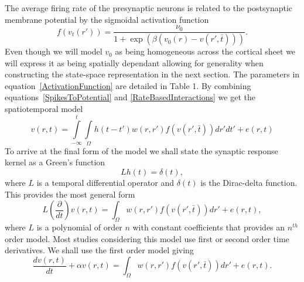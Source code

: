\documentclass[onecolumn,draftcls]{IEEEtran}
\begin{document}
The average firing rate of the presynaptic neurons is related to the postsynaptic membrane potential by the sigmoidal activation function
\begin{equation}\label{ActivationFunction}
f\left( {{v_t}\left( {r'} \right)} \right) = \frac{{{\nu _0}}}{{1 + \exp \left( {\beta \left( {{v_0}\left( r \right) - {v}\left(r',\bar{t} \right)} \right)} \right)}}.
\end{equation}
Even though we will model  $v_0$ as being homogeneous across the cortical sheet we will express it as being spatially dependant allowing for generality when constructing the state-space representation in the next section. The parameters in equation~\ref{ActivationFunction} are detailed in Table 1. By combining equations~\ref{SpikesToPotential} and \ref{RateBasedInteractions} we get the spatiotemporal model
\begin{equation}\label{FullDoubleIntModel}
v\left(r,t\right) = \int\limits_{-\infty}^t\int\limits_\Omega  h\left(t - t'\right)w\left(r,r'\right)f\left( v\left( r',\bar t \right)\right)dr' dt'+e\left(r,t\right)
\end{equation}
To arrive at the final form of the model we shall state the synaptic response kernel as a Green's function
\begin{equation}\label{GreensFuncDef}
Lh\left( t \right) = \delta \left( t \right),
\end{equation}
where $L$ is a temporal differential operator and $\delta(t)$ is the Dirac-delta function. This provides the most general form
\begin{equation}\label{GenForm}
L\left( {\frac{\partial }{{dt}}} \right)v\left( {r,t} \right) = \int_\Omega  {w\left( {r,r'} \right)f\left( {v\left( {r',\bar t} \right)} \right)dr'}  + e\left( {r,t} \right),
\end{equation}
where $L$ is a polynomial of order $n$ with constant coefficients that provides an $n^{th}$ order model. Most studies considering this model use first or second order time derivatives. We shall use the first order model giving
\begin{equation}\label{FinalForm1}
\frac{{dv\left( {r,t} \right)}}{{dt}} + \alpha{v\left( {r,t} \right)} = \int_\Omega  {w\left( {r,r'} \right)f\left( {v\left( {r',\bar t} \right)} \right)dr'}  +e\left( {r,t} \right).
\end{equation}
\end{document}
